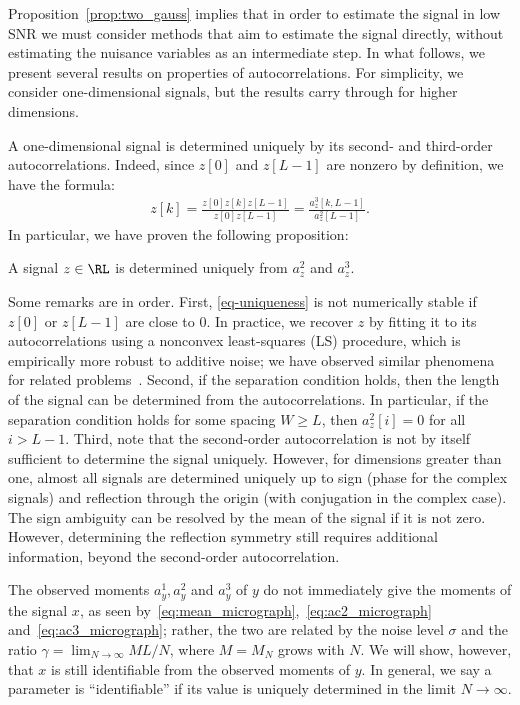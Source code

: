 \documentclass[9pt,twocolumn,twoside,lineno]{pnas-new}
\begin{document}
Proposition~\ref{prop:two_gauss} implies that in order to estimate the signal in low SNR  we must consider methods that aim to estimate the signal directly, without estimating the nuisance variables as an intermediate step. 
  In what follows, we present several results on properties of autocorrelations. For simplicity, we consider one-dimensional signals, but the results carry through for higher dimensions. 

A one-dimensional signal is determined uniquely by its second- and third-order autocorrelations. Indeed, since $z[0]$ and $z[L-1]$ are nonzero by definition, we have the formula:
%
\begin{align} \label{eq-uniqueness}
%
z[k] = \frac{z[0]z[k]z[L-1]}{z[0]z[L-1]} = \frac{a_z^3[k,L-1]}{a_z^2[L-1]}.
%
\end{align}
In particular, we have proven the following proposition:
\begin{proposition} \label{prop:uniqueness}
	 A signal $z\in\RL$ is determined uniquely from  $a_z^2$ and $a_z^3$.
\end{proposition}

Some remarks are in order. First, \eqref{eq-uniqueness} is not numerically stable if $z[0]$ or $z[L-1]$ are close to 0. In practice, we recover $z$ by fitting it to its autocorrelations using a nonconvex least-squares (LS) procedure, which is empirically more robust to additive noise; we have observed similar phenomena for related problems~\cite{bendory2017bispectrum,boumal2017heterogeneous,abbe2017multireference}.
Second, if the separation condition holds, then the length of the signal can be determined from the autocorrelations.
In particular, if the separation condition holds for some spacing $W\geq L$, then $a_z^2[i]=0$ for all $i>L-1$.
Third, note that the second-order autocorrelation is not by itself sufficient to determine the signal uniquely. %
However, for dimensions greater than one, almost all signals are determined uniquely up to sign (phase for the complex signals) and reflection through the origin (with conjugation in the complex case). %
The sign ambiguity can be resolved by the mean of the signal if it is not zero. However, determining the reflection symmetry still requires additional information, beyond the second-order autocorrelation.

The observed moments $a_y^1,a_y^2$ and $a_y^3$ of $y$ do not immediately give the moments of the signal $x$, as seen by~\eqref{eq:mean_micrograph},~\eqref{eq:ac2_micrograph} and~\eqref{eq:ac3_micrograph}; rather, the two are related by the noise level $\sigma$ and the ratio $\gamma = \lim_{N\to\infty}ML/N$,  where $M=M_N$ grows with $N$. We will show, however, that $x$ is still identifiable from the observed moments of $y$. In general, we say a parameter is ``identifiable'' if its value is uniquely determined in the limit $N \to \infty$.
\end{document}

